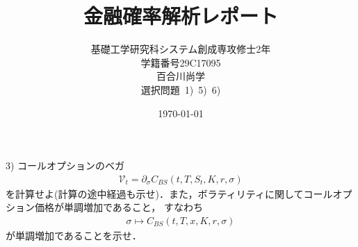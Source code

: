 \documentclass[11pt,a4paper]{jsarticle}
\title{金融確率解析レポート}
\author{基礎工学研究科システム創成専攻修士2年\\学籍番号29C17095\\百合川尚学\\選択問題\ 1)\ 5)\ 6)}
\date{\today}
\theoremstyle{mystyle}
\begin{document}
\maketitle

\begin{itembox}[l]{3)}
	コールオプションのベガ
	\begin{align}
		\mathcal{V}_{t} = \partial_{\sigma}C_{BS}(t,T,S_{t},K,r,\sigma)
	\end{align}
	を計算せよ(計算の途中経過も示せ)．また，ボラティリティに関してコールオプション価格が単調増加であること，
	すなわち
	\begin{align}
		\sigma \longmapsto C_{BS}(t,T,x,K,r,\sigma)
	\end{align}
	が単調増加であることを示せ．
\end{itembox}
\end{document}
